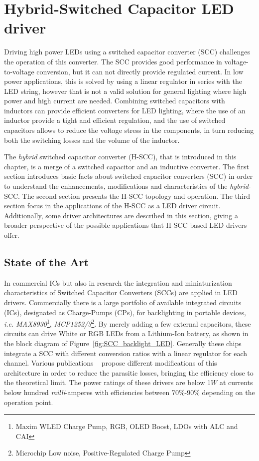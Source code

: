 
\chapter{Hybrid-Switched Capacitor LED driver}
\label{ch:H-SCC}
Driving high power LEDs using a switched capacitor converter (SCC) challenges the operation of this converter. The SCC provides good performance in voltage-to-voltage conversion, but it can not directly provide regulated current. In low power applications, this is solved by using a linear regulator in series with the LED string, however that is not a valid solution for general lighting where high power and high current are needed. Combining switched capacitors with inductors can provide efficient converters for LED lighting, where the use of an inductor provide a tight and efficient regulation, and the use of switched capacitors allows to reduce the voltage stress in the components, in turn reducing both the switching losses and the volume of the inductor.

The \emph{hybrid} switched capacitor converter (H-SCC), that is introduced in this chapter, is a merge of a switched capacitor and an inductive converter. The first section introduces basic facts about switched capacitor converters (SCC) in order to understand the enhancements, modifications and characteristics of the \emph{hybrid}-SCC. The second section presents the H-SCC topology and  operation. The third section focus in the applications of the H-SCC as a LED driver circuit. Additionally, some driver architectures are described in this section, giving a broader perspective of the possible applications that H-SCC based LED drivers offer.

\section{State of the Art}
In  commercial ICs but also in research the integration and miniaturization characteristics of Switched Capacitor Converters (SCCs) are applied in LED drivers. Commercially there is a large portfolio of available integrated circuits (ICs), designated as Charge-Pumps (CPs), for backlighting in portable devices, \emph{i.e.}  \emph{MAX8930}\footnote{Maxim\textsuperscript{\textregistered} WLED Charge Pump, RGB, OLED Boost, LDOs with ALC and CAI }, \emph{MCP1252/3}\footnote{Microchip\textsuperscript{\textregistered} Low noise, Positive-Regulated Charge Pump}. By merely adding a few external capacitors, these circuits can drive White or RGB LEDs from a Lithium-Ion battery, as shown in the block diagram of Figure~\ref{fig:SCC_backlight_LED}. Generally these chips integrate a SCC with different conversion ratios with a linear regulator for each channel. Various publications ~\cite{07Feng,09Wu,10Yin} propose different modifications of this architecture in order to reduce the parasitic losses, bringing the efficiency close to the theoretical limit. The power ratings of these drivers are below 1$W$ at currents below hundred \emph{milli}-amperes with efficiencies between 70\%-90\% depending on the operation point.

